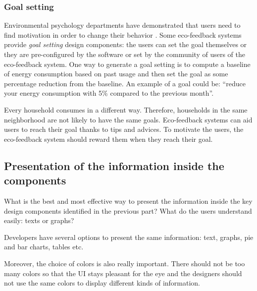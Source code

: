 \documentclass[journal]{vgtc}                %
\begin{document}
\subsubsection{Goal setting}
Environmental psychology departments have demonstrated that users need to find motivation in order to change their behavior \cite{abrahamse2007effect}.
Some eco-feedback systems provide \textit{goal setting} design components: the users can set the goal themselves or they are pre-configured by the software or set by the community of users of the eco-feedback system.  %
One way to generate a goal setting is to compute a baseline of energy consumption based on past usage and then set the goal as some percentage reduction from the baseline. %
An example of a goal could be: ``reduce your energy consumption with 5\% compared to the previous month''.

Every household consumes in a different way. Therefore, households in the same neighborhood are not likely to have the same goals.
Eco-feedback systems can aid users to reach their goal thanks to tips and advices.
To motivate the users, the eco-feedback system should reward them when they reach their goal. 



\subsection{Presentation of the information inside the components} %

What is the best and most effective way to present the information inside the key design components identified in the previous part? What do the users understand easily: texts or graphs?

Developers have several options to present the same information: text, graphs, pie and bar charts, tables etc.

Moreover, the choice of colors is also really important. There should not be too many colors so that the UI stays pleasant for the eye and the designers should not use the same colors to display different kinds of information.
\end{document}
